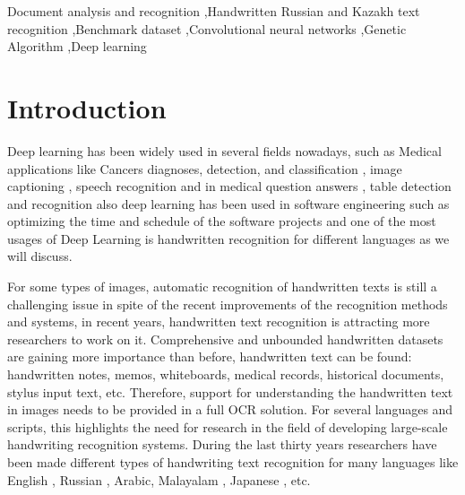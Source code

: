 \documentclass[preprint,12pt]{elsarticle}
\begin{document}
\begin{frontmatter}
\begin{keyword}


Document analysis and recognition \sep Handwritten Russian and Kazakh text
recognition \sep Benchmark dataset \sep Convolutional neural networks \sep  Genetic  Algorithm \sep Deep learning

\end{keyword}

\end{frontmatter}



\section{Introduction}
\label{sec:sample1}
 Deep learning has been widely used in several fields nowadays, such as Medical applications like Cancers diagnoses, detection, and classification \cite{fakoor2013using}, image captioning \cite{huang2019attention},  speech recognition \cite{chorowski2015attention} and in medical question answers \cite{nie2015disease,abdallah2020automated,yu2014deep}, table detection and recognition \cite{abdallah2021tncr,prasad2020cascadetabnet} also deep learning has been used in software engineering such as optimizing the time and schedule of the software projects \cite{waschneck2018optimization,hamada2021neural} and one of the most usages of Deep Learning is handwritten recognition for different languages as we will discuss.
 
 For some types of images, automatic recognition of handwritten texts is still a challenging issue in spite of the recent improvements of the recognition methods and systems, in recent years, handwritten text recognition is attracting more researchers to work on it. Comprehensive and unbounded handwritten datasets are gaining more importance than before, handwritten text can be found: handwritten notes, memos, whiteboards, medical records, historical documents, stylus input text, etc. Therefore, support for understanding the handwritten text in images needs to be provided in a full OCR solution.  For several languages and scripts, this highlights the need for research in the field of developing large-scale handwriting recognition systems. During the last thirty years researchers have been made different types of handwriting text recognition for many languages like English \cite{fischer2013fast,liu2005handwritten,zamora2014neural}, Russian \cite{nurseitov2021handwritten}, Arabic\cite{mahmoud2014khatt,parvez2013arabic}, Malayalam \cite{jomy2013system}, Japanese \cite{das2014algorithm}, etc. 
 
\end{document}
